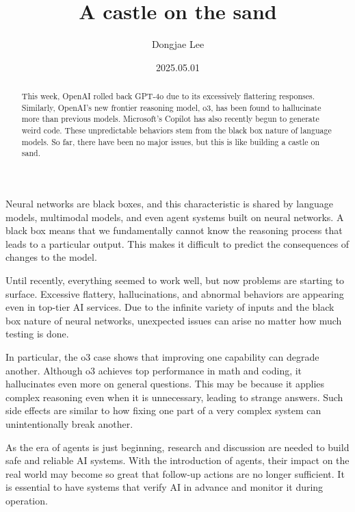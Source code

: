 \documentclass[11pt, oneside]{article}
\title{A castle on the sand}
\author{Dongjae Lee}
\date{2025.05.01}
\begin{document}
\maketitle

\begin{abstract}
	This week, OpenAI rolled back GPT-4o due to its excessively flattering responses.
	Similarly, OpenAI's new frontier reasoning model, o3, has been found to hallucinate more than previous models.
	Microsoft's Copilot has also recently begun to generate weird code.
	These unpredictable behaviors stem from the black box nature of language models.
	So far, there have been no major issues, but this is like building a castle on sand.
\end{abstract}
Neural networks are black boxes, and this characteristic is shared by language models, multimodal models, and even agent systems built on neural networks.
A black box means that we fundamentally cannot know the reasoning process that leads to a particular output.
This makes it difficult to predict the consequences of changes to the model.

Until recently, everything seemed to work well, but now problems are starting to surface.
Excessive flattery, hallucinations, and abnormal behaviors are appearing even in top-tier AI services.
Due to the infinite variety of inputs and the black box nature of neural networks, unexpected issues can arise no matter how much testing is done.

In particular, the o3 case shows that improving one capability can degrade another.
Although o3 achieves top performance in math and coding, it hallucinates even more on general questions.
This may be because it applies complex reasoning even when it is unnecessary, leading to strange answers.
Such side effects are similar to how fixing one part of a very complex system can unintentionally break another.

As the era of agents is just beginning, research and discussion are needed to build safe and reliable AI systems.
With the introduction of agents, their impact on the real world may become so great that follow-up actions are no longer sufficient.
It is essential to have systems that verify AI in advance and monitor it during operation.
\end{document}
